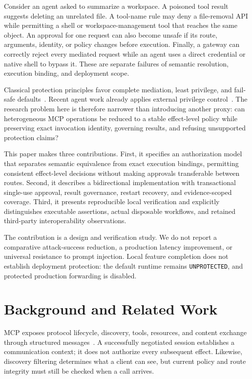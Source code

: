 \documentclass[conference,letterpaper]{IEEEtran}
\newcommand{\state}[1]{\texttt{#1}}
\begin{document}
Consider an agent asked to summarize a workspace. A poisoned tool result suggests deleting an unrelated file. A tool-name rule may deny a file-removal API while permitting a shell or workspace-management tool that reaches the same object. An approval for one request can also become unsafe if its route, arguments, identity, or policy changes before execution. Finally, a gateway can correctly reject every mediated request while an agent uses a direct credential or native shell to bypass it. These are separate failures of semantic resolution, execution binding, and deployment scope.

Classical protection principles favor complete mediation, least privilege, and fail-safe defaults~\cite{saltzer1975}. Recent agent work already applies external privilege control~\cite{progent2026}. The research problem here is therefore narrower than introducing another proxy: can heterogeneous MCP operations be reduced to a stable effect-level policy while preserving exact invocation identity, governing results, and refusing unsupported protection claims?

This paper makes three contributions. First, it specifies an authorization model that separates semantic equivalence from exact execution bindings, permitting consistent effect-level decisions without making approvals transferable between routes. Second, it describes a bidirectional implementation with transactional single-use approval, result governance, restart recovery, and evidence-scoped coverage. Third, it presents reproducible local verification and explicitly distinguishes executable assertions, actual disposable workflows, and retained third-party interoperability observations.

The contribution is a design and verification study. We do not report a comparative attack-success reduction, a production latency improvement, or universal resistance to prompt injection. Local feature completion does not establish deployment protection: the default runtime remains \state{UNPROTECTED}, and protected production forwarding is disabled.

\section{Background and Related Work}
MCP exposes protocol lifecycle, discovery, tools, resources, and content exchange through structured messages~\cite{mcp2025}. A successfully negotiated session establishes a communication context; it does not authorize every subsequent effect. Likewise, discovery filtering determines what a client can see, but current policy and route integrity must still be checked when a call arrives.
\end{document}
